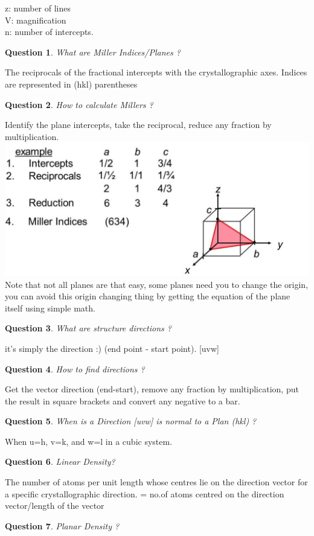 \documentclass[13]{article}
\newtheorem{exer}{Question}
\begin{document}
z: number of lines \\
V: magnification \\
n: number of intercepts.
\begin{exer}
What are Miller Indices/Planes ?
\end{exer}
The reciprocals of the fractional intercepts with the crystallographic axes. Indices are represented in (hkl) parentheses
\begin{exer}
How to calculate Millers ?
\end{exer}
Identify the plane intercepts, take the reciprocal, reduce any fraction by multiplication.\\ \includegraphics[scale=0.5]{figures/2021-05-16_03-22.png} \\ Note that not all planes are that easy, some planes need you to change the origin, you can avoid this origin changing thing by getting the equation of the plane itself using simple math.
\begin{exer}
What are structure directions ?
\end{exer}
it's simply the direction :) (end point - start point). [uvw]
\begin{exer}
	How to find directions ?
\end{exer}
Get the vector direction (end-start), remove any fraction by multiplication, put the result in square brackets and convert any negative to a bar.
\begin{exer}
	When is a Direction [uvw] is normal to a Plan (hkl) ?
\end{exer}
When u=h, v=k, and w=l in a cubic system.
\begin{exer}
Linear Density?
\end{exer}
The number of atoms per unit length whose centres lie on the direction vector for a specific crystallographic direction. = no.of atoms centred on the direction vector/length of the vector 
\begin{exer}
Planar Density ?
\end{exer}
\end{document}
